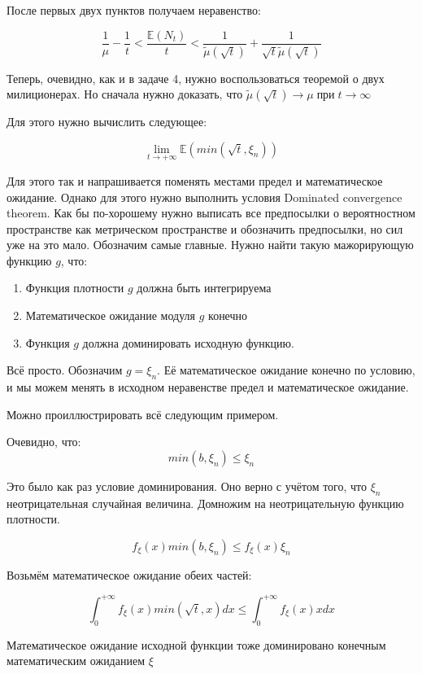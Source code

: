 \documentclass[a4paper,12pt]{article}
\def \mbb{\mathbb}
\def \E{\mbb{E}}
\begin{document}
После первых двух пунктов получаем неравенство:

\[ \frac{1}{\mu} - \frac{1 }{t}  < \frac{\E(N_t)}{t} < \frac{1}{\tilde{\mu}(\sqrt{t})} +\frac{1}{\sqrt{t}\tilde{\mu}(\sqrt{t})} \]

Теперь, очевидно, как и в задаче 4, нужно воспользоваться теоремой о двух милиционерах. Но сначала нужно доказать, что $\tilde{\mu}(\sqrt{t}) \rightarrow \mu \operatorname{ при } t \rightarrow \infty$

Для этого нужно вычислить следующее:

\[  \lim\limits_{t \rightarrow +\infty}   \E(min(\sqrt{t}, \xi_n)) \]

Для этого так и напрашивается поменять местами предел и математическое ожидание. Однако для этого нужно выполнить условия Dominated convergence theorem. Как бы по-хорошему нужно выписать все предпосылки о вероятностном пространстве как метрическом пространстве и обозначить предпосылки, но сил уже на это мало. Обозначим самые главные. Нужно найти такую мажорирующую функцию $ g $, что:

\begin{enumerate}[\Sun]
	\item Функция плотности $ g $ должна быть интегрируема
	
	\item Математическое ожидание модуля $ g $ конечно
	
	\item Функция $ g  $ должна доминировать исходную функцию.
\end{enumerate}

Всё просто. Обозначим $ g = \xi_n $. Её математическое ожидание конечно по условию, и мы можем менять в исходном неравенстве предел и математическое ожидание.

Можно проиллюстрировать всё следующим примером.

Очевидно, что:
\[ min(b, \xi_n) \le \xi_n\]

Это было как раз условие доминирования. Оно верно с учётом того, что $  \xi_n $ неотрицательная случайная величина. Домножим на неотрицательную функцию плотности.

\[f_\xi(x) min(b, \xi_n) \le f_\xi(x)\xi_n \]

Возьмём математическое ожидание обеих частей:

\[ \int_{0}^{+\infty} f_\xi(x) min(\sqrt{t}, x) dx \le \int_{0}^{+\infty} f_\xi(x) x dx \]


Математическое ожидание исходной функции тоже доминировано конечным математическим ожиданием $ \xi $
\end{document}
